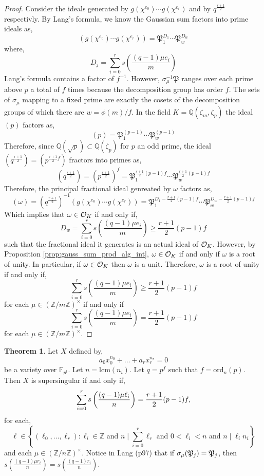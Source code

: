 \documentclass[12pt]{article}
\newcommand{\Z}{\mathbb{Z}}
\newcommand{\Q}{\mathbb{Q}}
\newcommand{\FF}{\mathbb{F}}
\newcommand{\divides}{\mid}
\theoremstyle{remark}
\theoremstyle{definition}
\newtheorem{theorem}{Theorem}[subsection]
\newcommand{\lcm}{\mathrm{lcm}}
\begin{document}
\begin{proof}
Consider the ideals generated by $g(\chi^{e_0}) \cdots g(\chi^{e_r})$ and by $q^{\frac{r+1}{2}}$ respectivly. By Lang's formula, we know the Gaussian sum factors into prime ideals as,
\[ (g(\chi^{e_0}) \cdots g(\chi^{e_r})) = \mathfrak{P}_1^{D_1} \cdots \mathfrak{P}_{w}^{D_{w}} \]
where,
\[ D_j = \sum_{i = 0}^r s\left(\frac{(q-1) \mu e_i}{m}\right) \]
Lang's formula contains a factor of $f^{-1}$. However, $\sigma_\mu^{-1} \mathfrak{P}$ ranges over each prime above $p$ a total of $f$ times because the decomposition group has order $f$. The sets of $\sigma_\mu$ mapping to a fixed prime are exactly the cosets of the decomposition groups of which there are $w = \phi(m)/f$. In the field $K = \Q(\zeta_m, \zeta_p)$ the ideal $(p)$ factors as,
\[ (p) = \mathfrak{P}_1^{(p-1)} \cdots \mathfrak{P}_w^{(p-1)} \] Therefore, since $\Q(\sqrt{p}) \subset \Q(\zeta_p)$ for $p$ an odd prime, the ideal $(q^{\frac{r+1}{2}}) = (p^{\frac{r+1}{2} f})$ fractors into primes as,
\[ (q^\frac{r+1}{2}) = (p^\frac{r+1}{2})^f = \mathfrak{P}_1^{\frac{r+1}{2} (p-1) f} \cdots \mathfrak{P}_w^{\frac{r+1}{2} (p-1) f} \]
Therefore, the principal fractional ideal genreated by $\omega$ factors as,
\[ (\omega) = (q^{\frac{r+1}{2}})^{-1} (g(\chi^{e_0}) \cdots g(\chi^{e_r})) = \mathfrak{P}_1^{D_1 - \frac{r+1}{2} (p-1) f} \cdots \mathfrak{P}_{w}^{D_{w} - \frac{r+1}{2} (p-1) f } \] 
Which implies that $\omega \in \mathcal{O}_K$ if and only if,
\[ D_w =\sum_{i = 0}^r s\left(\frac{(q-1) \mu e_i}{m}\right) \ge \frac{r+1}{2} (p - 1) f \]
such that the fractional ideal it generates is an actual ideal of $\mathcal{O}_{K}$. However, by Proposition \ref{prop:gauss_sum_prod_alg_int}, $\omega \in \mathcal{O}_K$ if and only if $\omega$ is a root of unity. In particular, if $\omega \in \mathcal{O}_K$ then $\omega$ is a unit. Therefore, $\omega$ is a root of unity if and only if,
\[ \sum_{i = 0}^r s\left(\frac{(q-1) \mu e_i}{m}\right) \ge \frac{r+1}{2} (p - 1) f \]
for each $\mu \in (\Z / m \Z)^\times$
if and only if
\[ \sum_{i = 0}^r s\left(\frac{(q-1) \mu e_i}{m}\right) = \frac{r+1}{2} (p - 1) f \]
for each $\mu \in (\Z / m \Z)^\times$. 
\end{proof}


\begin{theorem}\label{thm:gauss_factor_SS}
Let $X$ defined by,
\[ a_0 x_0^{n_0} + \dots + a_r x_r^{n_r} = 0 \]
be a variety over $\FF_{p^t}$. Let $n = \lcm(n_i)$. Let $q = p^f$ such that $f = \text{ord}_n(p)$. Then $X$ is supersingular if and only if,
\[ \sum_{i = 0}^{r} s\left(  \frac{(q-1)\mu \ell_i}{n}  \right) = \frac{r+1}{2}(p - 1)f,\]
for each,
\[ \ell \in \left\{(\ell_0, \dots, \ell_r) : \ell_i \in \Z \text{ and } n \divides \sum_{i = 0}^{r} \ell_r \text{ and } 0 < \ell_i < n \text{ and } n \divides \ell_i n_i \right\} \]
and each $\mu \in (\Z/n\Z)^\times$. Notice in Lang (p97) that if $\sigma_\mu(\mathfrak{P}_j) = \mathfrak{P}_j$, then $s\left(\frac{(q-1)\mu r_i}{n}\right) = s\left(\frac{(q-1) r_i}{n}\right)$.
\end{theorem}
\end{document}
